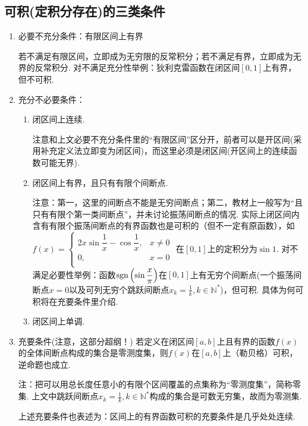   \subsection{可积(定积分存在)的三类条件}
    \begin{enumerate}[label=(\arabic*)]
      \item 必要不充分条件：有限区间上有界

      若不满足有限区间，立即成为无穷限的反常积分；若不满足有界，立即成为无界的反常积分. 对不满足充分性举例：狄利克雷函数在闭区间$[0,1]$上有界，但不可积.
      \item 充分不必要条件：
      \begin{enumerate}[label=(\roman*)]
        \item 闭区间上连续.

        注意和上文必要不充分条件里的“有限区间”区分开，前者可以是开区间(采用补充定义法立即变为闭区间)，而这里必须是闭区间(开区间上的连续函数可能无界).
        \item 闭区间上有界，且只有有限个间断点.

        注意：第一，这里的间断点不能是无穷间断点；第二，教材上一般写为“且只有有限个第一类间断点”，并未讨论振荡间断点的情况. 实际上闭区间内含有有限个振荡间断点的有界函数也是可积的（但不一定有原函数），如
        $f\left( x \right) =\begin{cases}
          2x\sin \dfrac{1}{x}-\cos \dfrac{1}{x},&   x\ne 0\\
          0, &    x=0\\
        \end{cases}$
        在$[0,1]$上的定积分为$\sin 1$.
        对不满足必要性举例：函数$\operatorname{\operatorname{sgn}}\left(\sin\dfrac{x}{\pi}\right)$在$[0,1]$上有无穷个间断点(一个振荡间断点$x = 0$以及可列无穷个跳跃间断点$x_k = \frac{1}{k}, k \in \mathbb{N}^\ast$)，但可积. 具体为何可积将在充要条件里介绍.
        \item 闭区间上单调.
      \end{enumerate}
      \item 充要条件(注意，这部分超纲！)
      若定义在闭区间$[a,b]$上且有界的函数$f(x)$的全体间断点构成的集合是零测度集，则$f(x)$在$[a,b]$上（勒贝格）可积，逆命题也成立.

        注：把可以用总长度任意小的有限个区间覆盖的点集称为“零测度集”，简称零集. 上文中跳跃间断点$x_k = \frac{1}{k}, k \in \mathbb{N}^\ast$构成的集合是可数无穷集，故而为零测集.

      上述充要条件也表述为：区间上的有界函数可积的充要条件是几乎处处连续.
    \end{enumerate}

